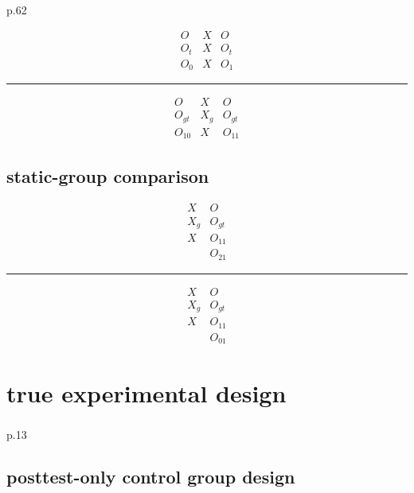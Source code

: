 \documentclass[
]{book}
\theoremstyle{definition}
\theoremstyle{definition}
\theoremstyle{definition}
\theoremstyle{definition}
\theoremstyle{remark}
\begin{document}
\textsuperscript{} p.62

\[
\begin{array}{ccc}
O & X & O \\
O_{t} & X & O_{t} \\
O_{0} & X & O_{1}
\end{array}
\]

\begin{center}\rule{0.5\linewidth}{0.5pt}\end{center}

\[
\begin{array}{ccc}
O & X & O \\
O_{gt} & X_{g} & O_{gt} \\
O_{10} & X & O_{11}
\end{array}
\]

\subsection{static-group comparison}\label{static-group-comparison}

\[
\begin{array}{ccc}
X & O \\
X_{g} & O_{gt} \\
X & O_{11} \\
  & O_{21}
\end{array}
\]

\begin{center}\rule{0.5\linewidth}{0.5pt}\end{center}

\[
\begin{array}{ccc}
X & O \\
X_{g} & O_{gt} \\
X & O_{11} \\
  & O_{01}
\end{array}
\]

\section{true experimental design}\label{true-experimental-design}

\textsuperscript{} p.13

\subsection{posttest-only control group design}\label{posttest-only-control-group-design}
\end{document}
